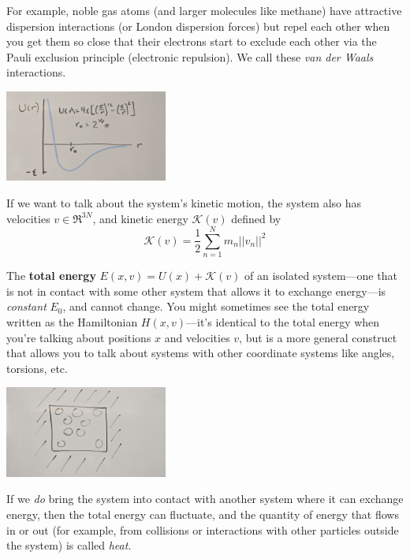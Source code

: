\documentclass[english,course]{lecture}
\begin{document}
For example, noble gas atoms (and larger molecules like methane) have attractive dispersion interactions (or London dispersion forces) but repel each other when you get them so close that their electrons start to exclude each other via the Pauli exclusion principle (electronic repulsion).
We call these \emph{van der Waals} interactions.

\begin{centering}
\includegraphics[width=0.4\textwidth]{figures/lennard-jones-potential.jpg}

\end{centering}

If we want to talk about the system's kinetic motion, the system also has velocities $v \in \Re^{3N}$, and kinetic energy $\mathcal{K}(v)$ defined by
\begin{equation}
\mathcal{K}(v) = \frac{1}{2} \sum_{n=1}^N m_n ||v_n||^2
\end{equation}

The {\bf total energy} $E(x,v) = U(x) + \mathcal{K}(v)$ of an isolated system---one that is not in contact with some other system that allows it to exchange energy---is \emph{constant} $E_0$, and cannot change.
You might sometimes see the total energy written as the Hamiltonian $H(x,v)$---it's identical to the total energy when you're talking about positions $x$ and velocities $v$, but is a more general construct that allows you to talk about systems with other coordinate systems like angles, torsions, etc.

\begin{centering}
\includegraphics[width=0.4\textwidth]{figures/system-in-isolation.jpg}

\end{centering}

If we \emph{do} bring the system into contact with another system where it can exchange energy, then the total energy can fluctuate, and the quantity of energy that flows in or out (for example, from collisions or interactions with other particles outside the system) is called \emph{heat}.
\end{document}
